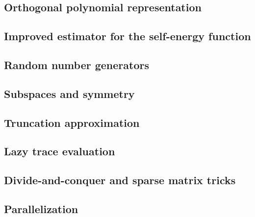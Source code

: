 \documentclass[10pt]{book}
\begin{document}
\subsection{Orthogonal polynomial representation}
\subsection{Improved estimator for the self-energy function}
\subsection{Random number generators}
\subsection{Subspaces and symmetry}
\subsection{Truncation approximation}
\subsection{Lazy trace evaluation}
\subsection{Divide-and-conquer and sparse matrix tricks}
\subsection{Parallelization}

\backmatter
\pagestyle{plain}




\end{document}
